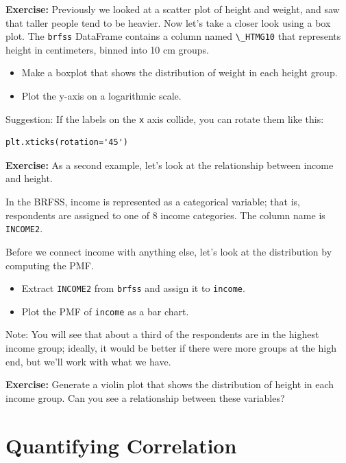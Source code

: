 \textbf{Exercise:} Previously we looked at a scatter plot of height and
weight, and saw that taller people tend to be heavier. Now let's take a
closer look using a box plot. The \passthrough{\lstinline!brfss!}
DataFrame contains a column named \passthrough{\lstinline!\_HTMG10!}
that represents height in centimeters, binned into 10 cm groups.

\begin{itemize}
\item
  Make a boxplot that shows the distribution of weight in each height
  group.
\item
  Plot the y-axis on a logarithmic scale.
\end{itemize}

Suggestion: If the labels on the \passthrough{\lstinline!x!} axis
collide, you can rotate them like this:

\begin{lstlisting}
plt.xticks(rotation='45')
\end{lstlisting}

\textbf{Exercise:} As a second example, let's look at the relationship
between income and height.

In the BRFSS, income is represented as a categorical variable; that is,
respondents are assigned to one of 8 income categories. The column name
is \passthrough{\lstinline!INCOME2!}.

Before we connect income with anything else, let's look at the
distribution by computing the PMF.

\begin{itemize}
\item
  Extract \passthrough{\lstinline!INCOME2!} from
  \passthrough{\lstinline!brfss!} and assign it to
  \passthrough{\lstinline!income!}.
\item
  Plot the PMF of \passthrough{\lstinline!income!} as a bar chart.
\end{itemize}

Note: You will see that about a third of the respondents are in the
highest income group; ideally, it would be better if there were more
groups at the high end, but we'll work with what we have.

\textbf{Exercise:} Generate a violin plot that shows the distribution of
height in each income group. Can you see a relationship between these
variables?

\hypertarget{quantifying-correlation}{%
\section{Quantifying Correlation}\label{quantifying-correlation}}

